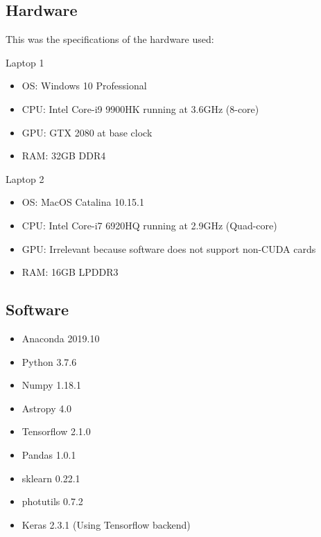 \documentclass[a4paper,fleqn,usenatbib]{mnras}
\begin{document}
\subsection{Hardware}
This was the specifications of the hardware used:

Laptop 1
\begin{itemize}
\item OS: Windows 10 Professional
\item CPU: Intel Core-i9 9900HK running at 3.6GHz (8-core)
\item GPU: GTX 2080 at base clock
\item RAM: 32GB DDR4
\end{itemize}

Laptop 2
\begin{itemize}
\item OS: MacOS Catalina 10.15.1
\item CPU: Intel Core-i7 6920HQ running at 2.9GHz (Quad-core)
\item GPU: Irrelevant because software does not support non-CUDA cards
\item RAM: 16GB LPDDR3
\end{itemize}

\subsection{Software}
\begin{itemize}
\item Anaconda 2019.10
\item Python 3.7.6
\item Numpy 1.18.1
\item Astropy 4.0
\item Tensorflow 2.1.0
\item Pandas 1.0.1
\item sklearn 0.22.1
\item photutils 0.7.2
\item Keras 2.3.1 (Using Tensorflow backend)	
\end{itemize}

\bsp	%
\label{lastpage}
\end{document}
